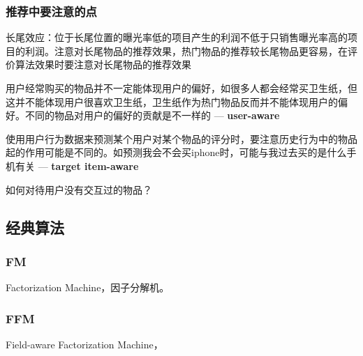 \subsubsection{推荐中要注意的点}
\begin{myitemize}
	\item 长尾效应：位于长尾位置的曝光率低的项目产生的利润不低于只销售曝光率高的项目的利润。注意对长尾物品的推荐效果，热门物品的推荐较长尾物品更容易，在评价算法效果时要注意对长尾物品的推荐效果
	\item 用户经常购买的物品并不一定能体现用户的偏好，如很多人都会经常买卫生纸，但这并不能体现用户很喜欢卫生纸，卫生纸作为热门物品反而并不能体现用户的偏好。不同的物品对用户的偏好的贡献是不一样的 --- \textbf{user-aware}
	\item 使用用户行为数据来预测某个用户对某个物品的评分时，要注意历史行为中的物品起的作用可能是不同的\cite{he2018nais}。如预测我会不会买iphone时，可能与我过去买的是什么手机有关 --- \textbf{target item-aware}
	\item 如何对待用户没有交互过的物品？
\end{myitemize}


\subsection{经典算法}
\subsubsection{FM}
Factorization Machine，因子分解机。

\subsubsection{FFM}
Field-aware Factorization Machine，